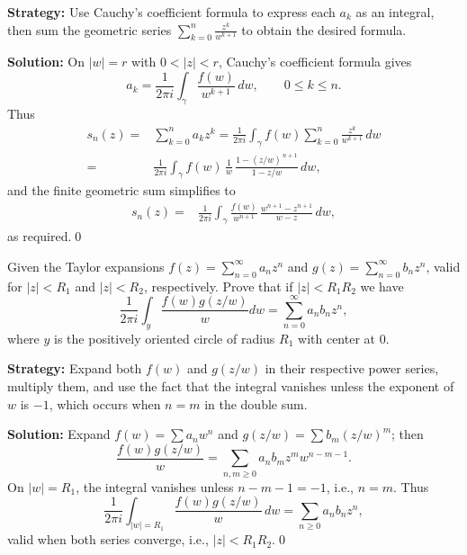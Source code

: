 \noindent\textbf{Strategy:} Use Cauchy's coefficient formula to express each \( a_k \) as an integral, then sum the geometric series \( \sum_{k=0}^n \frac{z^k}{w^{k+1}} \) to obtain the desired formula.

\bigskip\noindent\textbf{Solution:}
On $|w|=r$ with $0<|z|<r$, Cauchy's coefficient formula gives
\[a_k=\frac{1}{2\pi i}\int_\gamma \frac{f(w)}{w^{k+1}}\,dw,\qquad 0\le k\le n.\]
Thus
\begin{align*}
s_n(z)=&\sum_{k=0}^n a_k z^k=\frac{1}{2\pi i}\int_\gamma f(w)\sum_{k=0}^n \frac{z^k}{w^{k+1}}\,dw \\
=&\frac{1}{2\pi i}\int_\gamma f(w)\,\frac{1}{w}\,\frac{1-(z/w)^{\,n+1}}{1-z/w}\,dw,
\end{align*}
and the finite geometric sum simplifies to
\begin{align*}
s_n(z)=&\frac{1}{2\pi i}\int_\gamma \frac{f(w)}{w^{n+1}}\,\frac{w^{n+1}-z^{n+1}}{w-z}\,dw,
\end{align*}
as required.\qed


\begin{problembox}
\begin{problemstatement}
Given the Taylor expansions \( f(z) = \sum_{n=0}^{\infty} a_n z^n \) and \( g(z) = \sum_{n=0}^{\infty} b_n z^n \), valid for \( |z| < R_1 \) and \( |z| < R_2 \), respectively. Prove that if \( |z| < R_1 R_2 \) we have
\[ \frac{1}{2\pi i} \int_y \frac{f(w) g(z/w)}{w} dw = \sum_{n=0}^{\infty} a_n b_n z^n, \]
where \( y \) is the positively oriented circle of radius \( R_1 \) with center at 0.
\end{problemstatement}
\end{problembox}

\noindent\textbf{Strategy:} Expand both \( f(w) \) and \( g(z/w) \) in their respective power series, multiply them, and use the fact that the integral vanishes unless the exponent of \( w \) is \(-1\), which occurs when \( n = m \) in the double sum.

\bigskip\noindent\textbf{Solution:}
Expand $f(w)=\sum a_n w^n$ and $g(z/w)=\sum b_m (z/w)^m$; then
\[\frac{f(w)g(z/w)}{w}=\sum_{n,m\ge0} a_n b_m z^m w^{n-m-1}.\]
On $|w|=R_1$, the integral vanishes unless $n-m-1=-1$, i.e., $n=m$. Thus
\[\frac{1}{2\pi i}\int_{|w|=R_1}\frac{f(w)g(z/w)}{w}\,dw=\sum_{n\ge0} a_n b_n z^n,\]
valid when both series converge, i.e., $|z|<R_1R_2$.\qed


